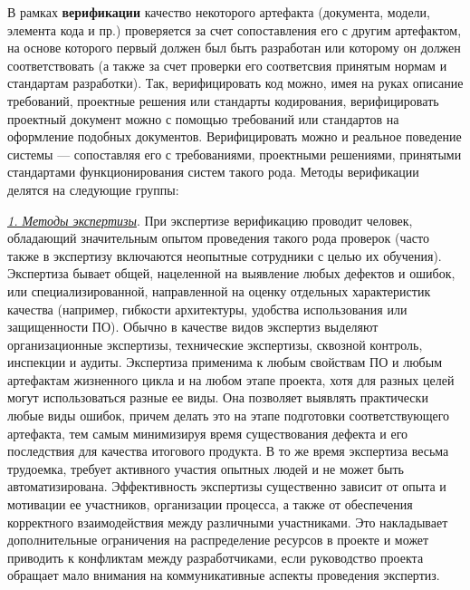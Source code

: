 В рамках \textbf{верификации} качество некоторого артефакта (документа, модели, элемента кода и пр.) проверяется за счет сопоставления его с другим артефактом, на основе которого первый должен был быть разработан или которому он должен соответствовать (а также за счет проверки его соответсвия принятым нормам и стандартам разработки). Так, верифицировать код можно, имея на руках описание требований, проектные решения или стандарты кодирования, верифицировать проектный документ можно с помощью требований или стандартов на оформление подобных документов. Верифицировать можно и реальное поведение системы — сопоставляя его с требованиями, проектными решениями, принятыми стандартами функционирования систем такого рода. Методы верификации делятся на следующие группы:

\underline{\textit{1. Методы экспертизы}}. При экспертизе верификацию проводит человек, обладающий значительным опытом проведения такого рода проверок (часто также в экспертизу включаются неопытные сотрудники с целью их обучения). Экспертиза бывает общей, нацеленной на выявление любых дефектов и ошибок, или специализированной, направленной на оценку отдельных характеристик качества (например, гибкости архитектуры, удобства использования или защищенности ПО). Обычно в качестве видов экспертиз выделяют организационные экспертизы, технические экспертизы, сквозной контроль, инспекции и аудиты. Экспертиза применима к любым свойствам ПО и любым артефактам жизненного цикла и на любом этапе проекта, хотя для разных целей могут использоваться разные ее виды. Она позволяет выявлять практически любые виды ошибок, причем делать это на этапе подготовки соответствующего артефакта, тем самым минимизируя время существования дефекта и его последствия для качества итогового продукта. В то же время экспертиза весьма трудоемка, требует активного участия опытных людей и не может быть автоматизирована. Эффективность экспертизы существенно зависит от опыта и мотивации ее участников, организации процесса, а также от обеспечения корректного взаимодействия между различными участниками. Это накладывает дополнительные ограничения на распределение ресурсов в проекте и может приводить к конфликтам между разработчиками, если руководство проекта обращает мало внимания на коммуникативные аспекты проведения экспертиз.

